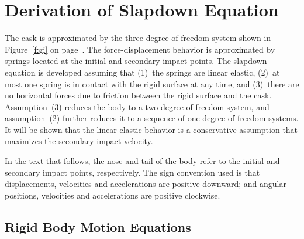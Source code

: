 \section{Derivation of Slapdown Equation}

The cask is approximated by the three degree-of-freedom system shown in
Figure~\ref{f:gi} on page~\pageref{f:gi}.  The force-displacement
behavior is approximated by springs located at the initial and secondary
impact points. The slapdown equation is developed assuming that (1)~the
springs are linear elastic, (2)~at most one spring is in contact with
the rigid surface at any time, and (3)~there are no horizontal forces
due to friction between the rigid surface and the cask.  Assumption~(3)
reduces the body to a two degree-of-freedom system, and assumption~(2)
further reduces it to a sequence of one degree-of-freedom systems. It
will be shown that the linear elastic behavior is a conservative
assumption that maximizes the secondary impact velocity. 

In the text that follows, the nose and tail of the body refer to
the initial and secondary impact points, respectively.  The sign
convention used is that displacements, velocities and accelerations are
positive downward; and angular positions, velocities and accelerations
are positive clockwise. 

\subsection{Rigid Body Motion Equations}


